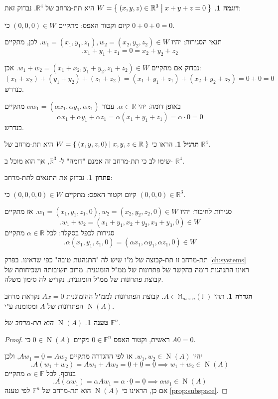 \documentclass[12pt]{report}
\theoremstyle{plain}
\newtheorem{proposition}[theorem]{טענה}
\theoremstyle{definition}
\newtheorem{definition}[theorem]{הגדרה}
\newtheorem{example}{דוגמה}[chapter]
\newtheorem{exercise}{תרגיל}[chapter]
\newtheorem*{solution}{פתרון}
\newcommand{\R}{\mathbb{R}}
\newcommand{\F}{\mathbb{F}}
\newcommand{\M}{\mathbb{M}}
\newcommand{\0}{\mathbf{0}}
\DeclareMathOperator{\Null}{N}
\begin{document}
\begin{example}
$W=\Set{(x,y,z)\in\R^3|x+y+z=0}$
היא תת-מרחב של
$\R^4$.
נבדוק זאת:

קיום וקטור האפס: מתקיים
$(0,0,0)\in W$
כי
$0+0+0=0$.

תנאי הסגירות: יהיו 
$
w_1=(x_1,y_1,z_1),w_2=(x_2,y_2,z_2)\in W
$.
לכן, מתקיים
$$
.x_1+y_1+z_1=0=x_2+y_2+z_2
$$

נבדוק אם מתקיים 
$w_1+w_2=(x_1+x_2,y_1+y_2,z_1+z_2)\in W$.
אכן:
$$
(x_1+x_2)+(y_1+y_2)+(z_1+z_2)=(x_1+y_1+z_1)+(x_2+y_2+z_2)=0+0=0
$$
כנדרש.

באופן דומה: יהי
$\alpha\in\R$.
עבור 
$\alpha w_1=(\alpha x_1,\alpha y_1,\alpha z_1)$
מתקיים
$$
\alpha x_1+\alpha y_1+\alpha z_1=\alpha(x_1+y_1+z_1)=\alpha\cdot 0=0
$$
כנדרש.
\end{example}

\begin{exercise}
הראו כי
$W=\Set{(x,y,z,0)|x,y,z\in\R}$
היא תת-מרחב של
$\R^4$.

שימו לב כי תת-מרחב זה אמנם "דומה" ל-
$\R^3$,
אך הוא מוכל ב-
$\R^4$.
\end{exercise}

\begin{solution}
נבדוק את התנאים לתת-מרחב:

קיום וקטור האפס: מתקיים
$(0,0,0,0)\in W$
כי 
$(0,0,0)\in\R^3$.

סגירות לחיבור: יהיו
$w_1=(x_1,y_1,z_1,0),w_2=(x_2,y_2,z_2,0)\in W$.
אז מתקיים
$$
.w_1+w_2=(x_1+y_1,x_2+y_2,x_3+y_3,0)\in W
$$
סגירות לכפל בסקלר: לכל
$\alpha\in\R$
מתקיים
$$
.\alpha(x_1,y_1,z_1,0)=(\alpha x_1,\alpha y_1,\alpha z_1,0)\in W
$$
\end{solution}

תת-מרחב זו תת-קבוצה של מ"ו שיש לה "התנהגות טובה" כפי שראינו. בפרק 
\ref{ch:systems}
ראינו התנהגות דומה בהקשר של פתרונות של ממ"ל הומוגנית. מרוב חשיבותה ושכיחותה של קבוצת פתרונות של ממ"ל הומוגנית, נקדיש לה סימון משלה.

\begin{definition}
\adddeftolist{מרחב הפתרונות $\Null(A)$}
תהי
$A\in\M_{m\times n}(\F)$.
קבוצת הפתרונות לממ"ל ההומוגנית
$Ax=\underline{0}$
נקראת מרחב הפתרונות של 
$A$
ומסומנת ע"י 
$\Null(A)$.
\end{definition}

\begin{proposition}
$\Null(A)$
הוא תת-מרחב של
$\F^n$.
\end{proposition}

\begin{proof}
ראשית, 
וקטור האפס 
$\underline{0}\in\F^n$
מקיים
$\underline{0}\in \Null(A)$
כי 
$A\underline{0}=\underline{0}$.

יהיו 
$w_1,w_2\in \Null(A)$.
אז לפי ההגדרה מתקיים 
$Aw_1=\underline{0}=Aw_2$,
ולכן
$$
.A(w_1+w_2)=Aw_1+Aw_2=\underline{0}+\underline{0}=\underline{0} \implies w_1+w_2\in \Null(A)
$$
בנוסף, לכל
$\alpha\in \F$
מתקיים
$$
.A(\alpha w_1)=\alpha Aw_1=\alpha\cdot \underline{0}=\underline{0} \implies \alpha w_1\in \Null(A)
$$
אם כן, הראינו כי 
$\Null(A)$
הוא תת-מרחב של
$\F^n$
לפי טענה
\ref{prop:subspace}.
\end{proof}
\end{document}
